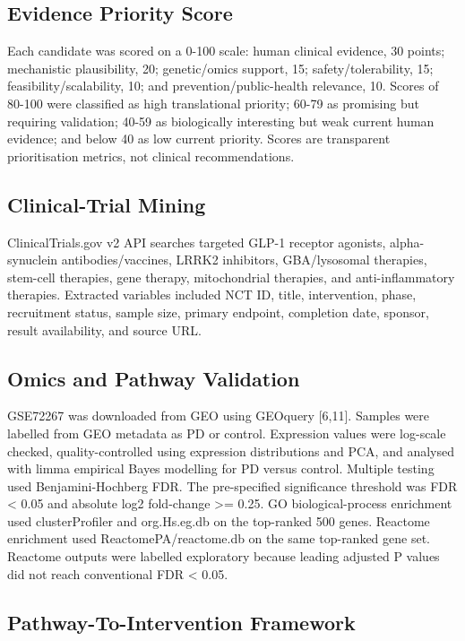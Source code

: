 \documentclass{article}
\begin{document}
\subsection{Evidence Priority Score}

Each candidate was scored on a 0-100 scale: human clinical evidence, 30 points; mechanistic plausibility, 20; genetic/omics support, 15; safety/tolerability, 15; feasibility/scalability, 10; and prevention/public-health relevance, 10. Scores of 80-100 were classified as high translational priority; 60-79 as promising but requiring validation; 40-59 as biologically interesting but weak current human evidence; and below 40 as low current priority. Scores are transparent prioritisation metrics, not clinical recommendations.


\subsection{Clinical-Trial Mining}

ClinicalTrials.gov v2 API searches targeted GLP-1 receptor agonists, alpha-synuclein antibodies/vaccines, LRRK2 inhibitors, GBA/lysosomal therapies, stem-cell therapies, gene therapy, mitochondrial therapies, and anti-inflammatory therapies. Extracted variables included NCT ID, title, intervention, phase, recruitment status, sample size, primary endpoint, completion date, sponsor, result availability, and source URL.


\subsection{Omics and Pathway Validation}

GSE72267 was downloaded from GEO using GEOquery [6,11]. Samples were labelled from GEO metadata as PD or control. Expression values were log-scale checked, quality-controlled using expression distributions and PCA, and analysed with limma empirical Bayes modelling for PD versus control. Multiple testing used Benjamini-Hochberg FDR. The pre-specified significance threshold was FDR < 0.05 and absolute log2 fold-change >= 0.25. GO biological-process enrichment used clusterProfiler and org.Hs.eg.db on the top-ranked 500 genes. Reactome enrichment used ReactomePA/reactome.db on the same top-ranked gene set. Reactome outputs were labelled exploratory because leading adjusted P values did not reach conventional FDR < 0.05.


\subsection{Pathway-To-Intervention Framework}
\end{document}
